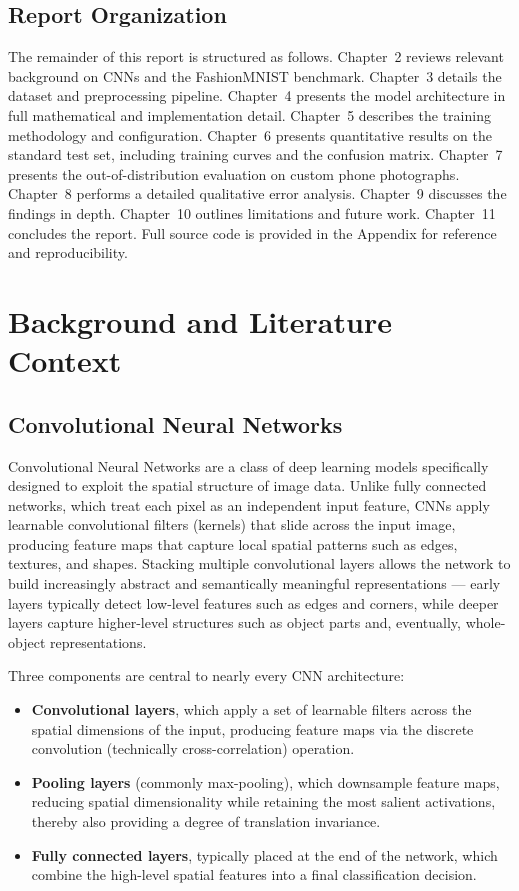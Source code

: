 \documentclass[12pt,a4paper]{report}
\begin{document}
\section{Report Organization}
The remainder of this report is structured as follows. Chapter~2 reviews relevant background on CNNs and the FashionMNIST benchmark. Chapter~3 details the dataset and preprocessing pipeline. Chapter~4 presents the model architecture in full mathematical and implementation detail. Chapter~5 describes the training methodology and configuration. Chapter~6 presents quantitative results on the standard test set, including training curves and the confusion matrix. Chapter~7 presents the out-of-distribution evaluation on custom phone photographs. Chapter~8 performs a detailed qualitative error analysis. Chapter~9 discusses the findings in depth. Chapter~10 outlines limitations and future work. Chapter~11 concludes the report. Full source code is provided in the Appendix for reference and reproducibility.

\chapter{Background and Literature Context}

\section{Convolutional Neural Networks}
Convolutional Neural Networks are a class of deep learning models specifically designed to exploit the spatial structure of image data. Unlike fully connected networks, which treat each pixel as an independent input feature, CNNs apply learnable convolutional filters (kernels) that slide across the input image, producing feature maps that capture local spatial patterns such as edges, textures, and shapes. Stacking multiple convolutional layers allows the network to build increasingly abstract and semantically meaningful representations — early layers typically detect low-level features such as edges and corners, while deeper layers capture higher-level structures such as object parts and, eventually, whole-object representations.

Three components are central to nearly every CNN architecture:

\begin{itemize}
    \item \textbf{Convolutional layers}, which apply a set of learnable filters across the spatial dimensions of the input, producing feature maps via the discrete convolution (technically cross-correlation) operation.
    \item \textbf{Pooling layers} (commonly max-pooling), which downsample feature maps, reducing spatial dimensionality while retaining the most salient activations, thereby also providing a degree of translation invariance.
    \item \textbf{Fully connected layers}, typically placed at the end of the network, which combine the high-level spatial features into a final classification decision.
\end{itemize}
\end{document}
